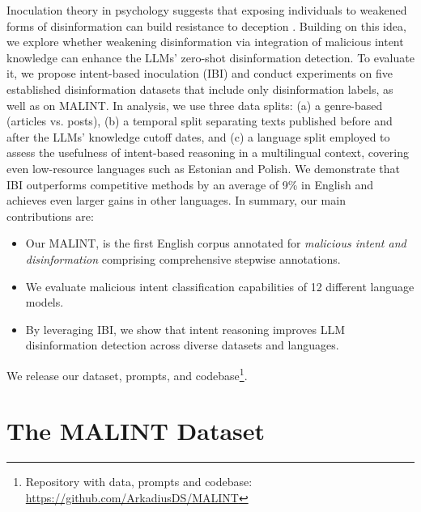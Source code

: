 \documentclass[11pt]{article}
\begin{document}
Inoculation theory in psychology suggests that exposing individuals to weakened forms of disinformation can build resistance to deception \cite{traberg2022psychological, roozenbeek2020prebunking}. Building on this idea, we explore whether weakening disinformation via integration of malicious intent knowledge can enhance the LLMs' zero-shot disinformation detection. To evaluate it, we propose intent-based inoculation (IBI) and conduct experiments on five established disinformation datasets that include only disinformation labels, as well as on MALINT. In analysis, we use three data splits: (a) a genre-based (articles vs. posts), (b) a temporal split separating texts published before and after the LLMs' knowledge cutoff dates, and (c) a language split employed to assess the usefulness of intent-based reasoning in a multilingual context, covering even low-resource languages such as Estonian and Polish. We demonstrate that IBI outperforms competitive methods by an average of 9\% in English and achieves even larger gains in other languages. In summary, our main contributions are:
\begin{itemize}[nosep, leftmargin=*]
    \item Our MALINT, is the first English corpus annotated for \textit{malicious intent and disinformation} comprising comprehensive stepwise annotations.
    \item We evaluate malicious intent classification capabilities of 12 different language models.
    \item By leveraging IBI, 
    we show that intent reasoning improves LLM disinformation detection across diverse datasets and languages.
\end{itemize}
\noindent We release our dataset, prompts, and codebase\footnote{Repository with data, prompts and codebase: \url{https://github.com/ArkadiusDS/MALINT}}.



\section{The MALINT Dataset}
\label{sec:malint_dataset}
\end{document}
